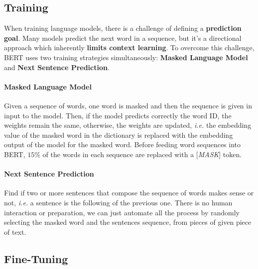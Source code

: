 \documentclass[oneside]{academica}
\begin{document}
\subsection{Training}

When training language models, there is a challenge of defining a \textbf{prediction goal}.
Many models predict the next word in a sequence, but it's a directional approach which inherently \textbf{limits context learning}.
To overcome this challenge, BERT uses two training strategies simultaneously: \textbf{Masked Language Model} and \textbf{Next Sentence Prediction}.

\paragraph{Masked Language Model}

Given a sequence of words, one word is masked and then the sequence is given in input to the model.
Then, if the model predicts correctly the word ID, the weights remain the same, otherwise, the weights are updated, \textit{i.e.} the embedding value of the masked word in the dictionary is replaced with the embedding output of the model for the masked word.
Before feeding word sequences into BERT, $15\%$ of the words in each sequence are replaced with a [\textit{MASK}] token.

\paragraph{Next Sentence Prediction}

Find if two or more sentences that compose the sequence of words makes sense or not, \textit{i.e.} a sentence is the following of the previous one. There is no human interaction or preparation, we can just automate all the process by randomly selecting the masked word and the sentences sequence, from pieces of given piece of text.

\subsection{Fine-Tuning}
\end{document}
